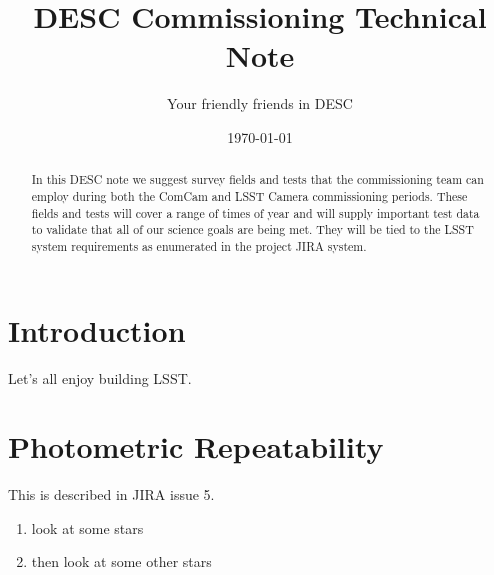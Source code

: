 \documentclass[modern]{desc-tex/styles/lsstdescnote}
\begin{document}
\title{DESC Commissioning Technical Note}
\author{Your friendly friends in DESC}
\date{\today}


\begin{abstract}
  In this DESC note we suggest survey fields and tests that the
  commissioning team can employ during both the ComCam and LSST Camera
  commissioning periods.  These fields and tests will cover a range of
  times of year and will supply important test data to validate that
  all of our science goals are being met.  They will be tied to the
  LSST system requirements as enumerated in the project JIRA system.
\end{abstract}

\maketitle

\noindent
\begin{center}
  \fboxsep=5pt  
 \end{center} 
\vspace{0.1in}

\section{Introduction}

Let's all enjoy building LSST.

\section{Photometric Repeatability}

This is described in JIRA issue 5.

\begin{enumerate}
\item look at some stars
\item then look at some other stars
\end{enumerate}

\begin{acknowledgments}

\end{acknowledgments}
  

\end{document}
